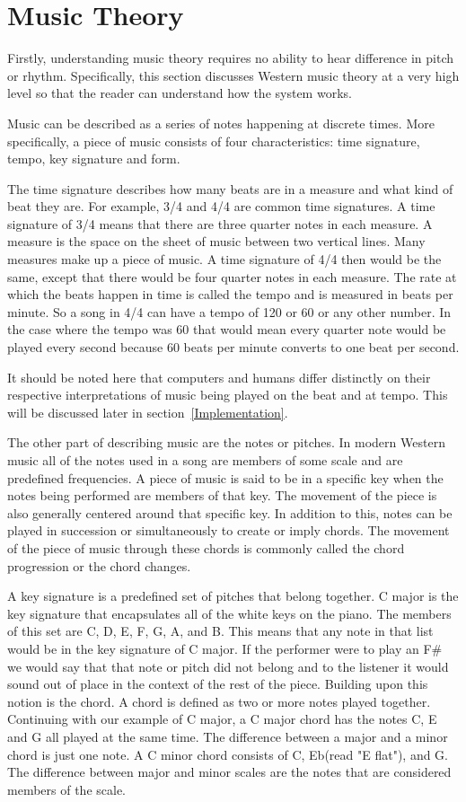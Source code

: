 \documentclass[12pt]{ucthesis}
\begin{document}
\section{Music Theory}
\label{rw:music-theory}

Firstly, understanding music theory requires no ability to hear difference in pitch or rhythm. Specifically, this section discusses Western music theory at a very high level so that the reader can understand how the system works. 

Music can be described as a series of notes happening at discrete times. More specifically, a piece of music consists of four characteristics: time signature, tempo, key signature and form.

The time signature describes how many beats are in a measure and what kind of beat they are. For example, 3/4 and 4/4 are common time signatures. A time signature of 3/4 means that there are three quarter notes in each measure. A measure is the space on the sheet of music between two vertical lines. Many measures make up a piece of music. A time signature of 4/4 then would be the same, except that there would be four quarter notes in each measure. The rate at which the beats happen in time is called the tempo and is measured in beats per minute. So a song in 4/4 can have a tempo of 120 or 60 or any other number. In the case where the tempo was 60 that would mean every quarter note would be played every second because 60 beats per minute converts to one beat per second. 

It should be noted here that computers and humans differ distinctly on their respective interpretations of music being played on the beat and at tempo. This will be discussed later in section~\ref{Implementation}.

The other part of describing music are the notes or pitches. In modern Western music all of the notes used in a song are members of some scale and are predefined frequencies. A piece of music is said to be in a specific key when the notes being performed are members of that key. The movement of the piece is also generally centered around that specific key. In addition to this, notes can be played in succession or simultaneously to create or imply chords. The movement of the piece of music through these chords is commonly called the chord progression or the chord changes. 

A key signature is a predefined set of pitches that belong together. C major is the key signature that encapsulates all of the white keys on the piano. The members of this set are C, D, E, F, G, A, and B. This means that any note in that list would be in the key signature of C major. If the performer were to play an F\# we would say that that note or pitch did not belong and to the listener it would sound out of place in the context of the rest of the piece. Building upon this notion is the chord. A chord is defined as two or more notes played together. Continuing with our example of C major, a C major chord has the notes C, E and G all played at the same time. The difference between a major and a minor chord is just one note. A C minor chord consists of C, Eb(read "E flat"), and G. The difference between major and minor scales are the notes that are considered members of the scale.
\end{document}
